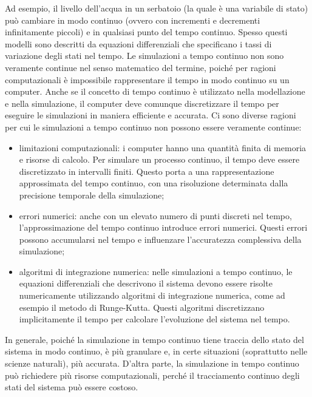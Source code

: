\documentclass[12pt,a4paper,openright,twoside]{book}
\begin{document}
Ad esempio, il livello dell'acqua in un serbatoio (la quale è una variabile di stato) può cambiare in modo continuo (ovvero con incrementi e decrementi infinitamente piccoli) e in qualsiasi punto del tempo continuo. Spesso questi modelli sono descritti da equazioni differenziali che specificano i tassi di variazione degli stati nel tempo.
Le simulazioni a tempo continuo non sono veramente continue nel senso matematico del termine, poiché per ragioni computazionali è impossibile rappresentare il tempo in modo continuo su un computer. Anche se il concetto di tempo continuo è utilizzato nella modellazione e nella simulazione, il computer deve comunque discretizzare il tempo per eseguire le simulazioni in maniera efficiente e accurata.
Ci sono diverse ragioni per cui le simulazioni a tempo continuo non possono essere veramente continue:
\begin{itemize}
    \item limitazioni computazionali: i computer hanno una quantità finita di memoria e risorse di calcolo. Per simulare un processo continuo, il tempo deve essere discretizzato in intervalli finiti. Questo porta a una rappresentazione approssimata del tempo continuo, con una risoluzione determinata dalla precisione temporale della simulazione;
    \item errori numerici: anche con un elevato numero di punti discreti nel tempo, l'approssimazione del tempo continuo introduce errori numerici. Questi errori possono accumularsi nel tempo e influenzare l'accuratezza complessiva della simulazione;
    \item algoritmi di integrazione numerica: nelle simulazioni a tempo continuo, le equazioni differenziali che descrivono il sistema devono essere risolte numericamente utilizzando algoritmi di integrazione numerica, come ad esempio il metodo di Runge-Kutta. Questi algoritmi discretizzano implicitamente il tempo per calcolare l'evoluzione del sistema nel tempo.
\end{itemize}

In generale, poiché la simulazione in tempo continuo tiene traccia dello stato del sistema in modo continuo, è più granulare e, in certe situazioni (soprattutto nelle scienze naturali), più accurata. D'altra parte, la simulazione in tempo continuo può richiedere più risorse computazionali, perché il tracciamento continuo degli stati del sistema può essere costoso.
\end{document}
